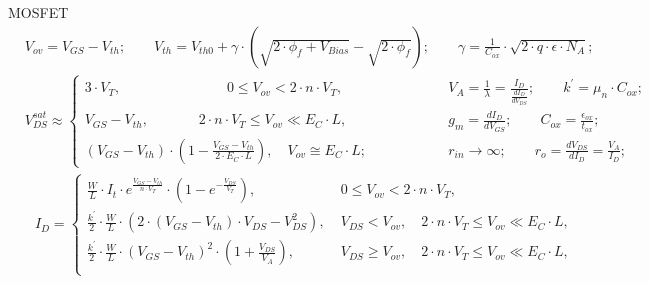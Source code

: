\documentclass[11pt]{article}
\begin{document}
\begin{sectionbox}{MOSFET}
\begin{align*}
& V_{ov} = V_{GS} - V_{th}; \qquad 
  V_{th} = V_{th0} + \gamma \cdot \left( \sqrt{2 \cdot \phi_f + V_{Bias}} - \sqrt{2 \cdot \phi_f} \right); \qquad 
  \gamma = \frac{1}{C_{ox}} \cdot \sqrt{2 \cdot q \cdot \epsilon \cdot N_A}; \\[0.3em]
& V_{DS}^{sat} \approx \begin{cases}
  3 \cdot V_T
  , \qquad \qquad \qquad \quad \;\;
  0 \leq V_{ov} < 2 \cdot n \cdot V_T
  , & \qquad \qquad \quad
  V_A = \frac{1}{\lambda} = \frac{I_D}{\frac{d I_D}{d V_{DS}}}; \qquad
  k^{\prime} = \mu_n \cdot C_{ox};
  \\[0.8em]
  V_{GS} - V_{th}, \qquad \quad \;\;
  2 \cdot n \cdot V_T \leq V_{ov} \ll E_C \cdot L
  , & \qquad \qquad \quad
  g_m = \frac{d I_D}{d V_{GS}}; \qquad
  C_{ox} = \frac{\epsilon_{ox}}{t_{ox}};
  \\[0.8em]
  (V_{GS} - V_{th}) \cdot \left( 1 - \frac{V_{GS} - V_{th}}{2 \cdot E_C \cdot L} \right)
  , \;\;\;\,
  V_{ov} \cong E_C \cdot L
  ; & \qquad \qquad \quad
  r_{in} \rightarrow \infty; \qquad
  r_o = \frac{d V_{DS}}{d I_D} = \frac{V_A}{I_D};
\end{cases} \\[0.8em]
& \;\;\, I_D = \begin{cases}
  \frac{W}{L} \cdot I_t \cdot e^{\frac{V_{GS} - V_{th}}{n \cdot V_T}} \cdot \left( 1 - e^{-\frac{V_{DS}}{V_T}} \right), & \; 
  0 \leq V_{ov} < 2 \cdot n \cdot V_T
  , \\[0.8em]
  \frac{k^{\prime}}{2} \cdot \frac{W}{L} \cdot \left(2 \cdot (V_{GS} - V_{th}) \cdot V_{DS} - V_{DS}^2 \right), & \; 
  V_{DS} < V_{ov}
  , \quad 
  2 \cdot n \cdot V_T \leq V_{ov} \ll E_C \cdot L
  , \\[0.5em]
  \frac{k^{\prime}}{2} \cdot \frac{W}{L} \cdot (V_{GS} - V_{th})^2 \cdot \left(1 + \frac{V_{DS}}{V_A}\right), & \; 
  V_{DS} \geq V_{ov}
  , \quad 
  2 \cdot n \cdot V_T \leq V_{ov} \ll E_C \cdot L
  , \\[0.8em]

\end{cases}
\end{align*}
\end{sectionbox}
\end{document}
